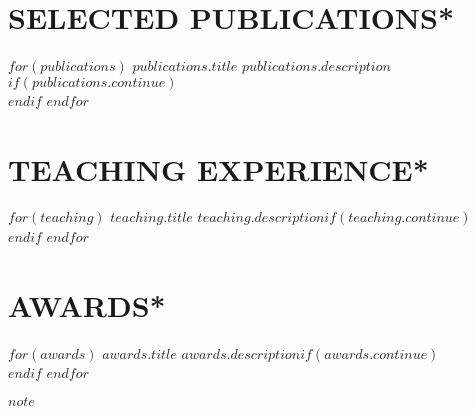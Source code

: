 \documentclass[a4paper, line, 11pt]{res} %
\begin{document}
\begin{resume}
\section{SELECTED PUBLICATIONS*}  
$for(publications)$
\textbf{$publications.title$} $publications.description$$if(publications.continue)$\\$endif$
$endfor$

\section{TEACHING EXPERIENCE*}  

$for(teaching)$
\textbf{$teaching.title$} $teaching.description$$if(teaching.continue)$\\$endif$
$endfor$

\section{AWARDS*}  

$for(awards)$
\textbf{$awards.title$} $awards.description$$if(awards.continue)$\\$endif$
$endfor$

\textbf{$note$}


\end{resume}
\end{document}
